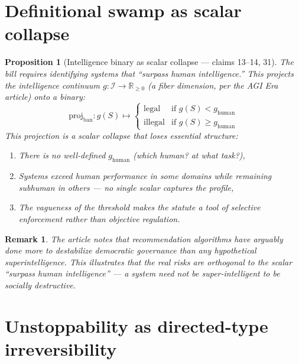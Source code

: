 \documentclass[11pt,a4paper]{article}
\newtheorem{proposition}[definition]{Proposition}
\newtheorem{remark}[definition]{Remark}
\begin{document}
\section{Definitional swamp as scalar collapse}
\label{sec:definitional}

\begin{proposition}[Intelligence binary as scalar collapse --- claims 13--14, 31]
\label{prop:def-swamp}
The bill requires identifying systems that ``surpass human intelligence.''
This projects the intelligence continuum $g : \mathcal{I} \to \mathbb{R}_{\geq 0}$
(a fiber dimension, per the AGI Era article) onto a binary:
\[
  \text{proj}_{\text{ban}} : g(S) \mapsto \begin{cases}
    \text{legal} & \text{if } g(S) < g_{\text{human}} \\
    \text{illegal} & \text{if } g(S) \geq g_{\text{human}}
  \end{cases}
\]
This projection is a scalar collapse that loses essential structure:
\begin{enumerate}
\item There is no well-defined $g_{\text{human}}$ (which human? at what task?),
\item Systems exceed human performance in some domains while remaining
  subhuman in others --- no single scalar captures the profile,
\item The vagueness of the threshold makes the statute a tool of
  selective enforcement rather than objective regulation.
\end{enumerate}
\end{proposition}

\begin{remark}
The article notes that recommendation algorithms have arguably done more
to destabilize democratic governance than any hypothetical superintelligence.
This illustrates that the real risks are orthogonal to the scalar
``surpass human intelligence'' --- a system need not be super-intelligent
to be socially destructive.
\end{remark}

\section{Unstoppability as directed-type irreversibility}
\label{sec:unstoppable}
\end{document}
